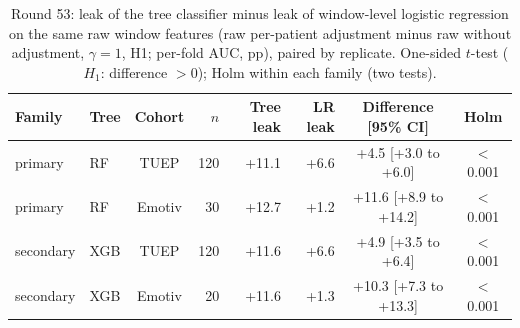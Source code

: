 \begin{table}[!htbp]
\caption{Round 53: leak of the tree classifier minus leak of window-level logistic regression on the same raw window features (raw per-patient adjustment minus raw without adjustment, $\gamma=1$, H1; per-fold AUC, pp), paired by replicate. One-sided $t$-test ($H_1$: difference $>0$); Holm within each family (two tests).}\label{tab:s2_p53}
\centering\scriptsize
\setlength{\tabcolsep}{3pt}
\begin{tabular}{llcrrrcc}
\toprule
Family & Tree & Cohort & $n$ & Tree leak & LR leak & Difference [95\% CI] & Holm \\
\midrule
primary & RF & TUEP & 120 & +11.1 & +6.6 & +4.5 [+3.0 to +6.0] & $<$0.001 \\
primary & RF & Emotiv & 30 & +12.7 & +1.2 & +11.6 [+8.9 to +14.2] & $<$0.001 \\
secondary & XGB & TUEP & 120 & +11.6 & +6.6 & +4.9 [+3.5 to +6.4] & $<$0.001 \\
secondary & XGB & Emotiv & 20 & +11.6 & +1.3 & +10.3 [+7.3 to +13.3] & $<$0.001 \\
\bottomrule
\end{tabular}
\end{table}
